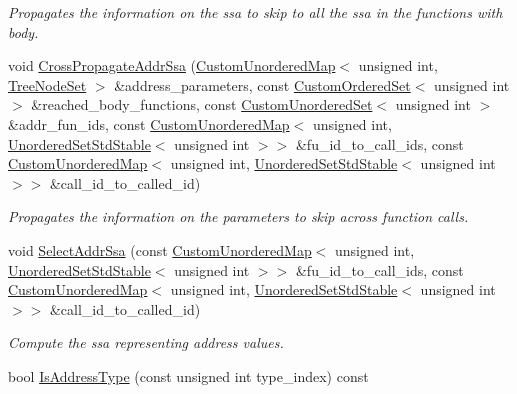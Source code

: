 \begin{DoxyCompactItemize}
\begin{DoxyCompactList}\small\item\em Propagates the information on the ssa to skip to all the ssa in the functions with body. \end{DoxyCompactList}\item 
void \hyperlink{classVcdSignalSelection_a7b1ff93c5a9469c61e0558047f601dc5}{Cross\+Propagate\+Addr\+Ssa} (\hyperlink{custom__map_8hpp_ad1ed68f2ff093683ab1a33522b144adc}{Custom\+Unordered\+Map}$<$ unsigned int, \hyperlink{classTreeNodeSet}{Tree\+Node\+Set} $>$ \&address\+\_\+parameters, const \hyperlink{classCustomOrderedSet}{Custom\+Ordered\+Set}$<$ unsigned int $>$ \&reached\+\_\+body\+\_\+functions, const \hyperlink{classCustomUnorderedSet}{Custom\+Unordered\+Set}$<$ unsigned int $>$ \&addr\+\_\+fun\+\_\+ids, const \hyperlink{custom__map_8hpp_ad1ed68f2ff093683ab1a33522b144adc}{Custom\+Unordered\+Map}$<$ unsigned int, \hyperlink{custom__set_8hpp_a1f63d303cef2790dc0a0ff7feae38f83}{Unordered\+Set\+Std\+Stable}$<$ unsigned int $>$$>$ \&fu\+\_\+id\+\_\+to\+\_\+call\+\_\+ids, const \hyperlink{custom__map_8hpp_ad1ed68f2ff093683ab1a33522b144adc}{Custom\+Unordered\+Map}$<$ unsigned int, \hyperlink{custom__set_8hpp_a1f63d303cef2790dc0a0ff7feae38f83}{Unordered\+Set\+Std\+Stable}$<$ unsigned int $>$$>$ \&call\+\_\+id\+\_\+to\+\_\+called\+\_\+id)
\begin{DoxyCompactList}\small\item\em Propagates the information on the parameters to skip across function calls. \end{DoxyCompactList}\item 
void \hyperlink{classVcdSignalSelection_a80efeb0f8a7939933ad735730d967f24}{Select\+Addr\+Ssa} (const \hyperlink{custom__map_8hpp_ad1ed68f2ff093683ab1a33522b144adc}{Custom\+Unordered\+Map}$<$ unsigned int, \hyperlink{custom__set_8hpp_a1f63d303cef2790dc0a0ff7feae38f83}{Unordered\+Set\+Std\+Stable}$<$ unsigned int $>$$>$ \&fu\+\_\+id\+\_\+to\+\_\+call\+\_\+ids, const \hyperlink{custom__map_8hpp_ad1ed68f2ff093683ab1a33522b144adc}{Custom\+Unordered\+Map}$<$ unsigned int, \hyperlink{custom__set_8hpp_a1f63d303cef2790dc0a0ff7feae38f83}{Unordered\+Set\+Std\+Stable}$<$ unsigned int $>$$>$ \&call\+\_\+id\+\_\+to\+\_\+called\+\_\+id)
\begin{DoxyCompactList}\small\item\em Compute the ssa representing address values. \end{DoxyCompactList}\item 
bool \hyperlink{classVcdSignalSelection_a0f3b879787fa7afb91ef8a7a9b4b52d1}{Is\+Address\+Type} (const unsigned int type\+\_\+index) const

\end{DoxyCompactItemize}
